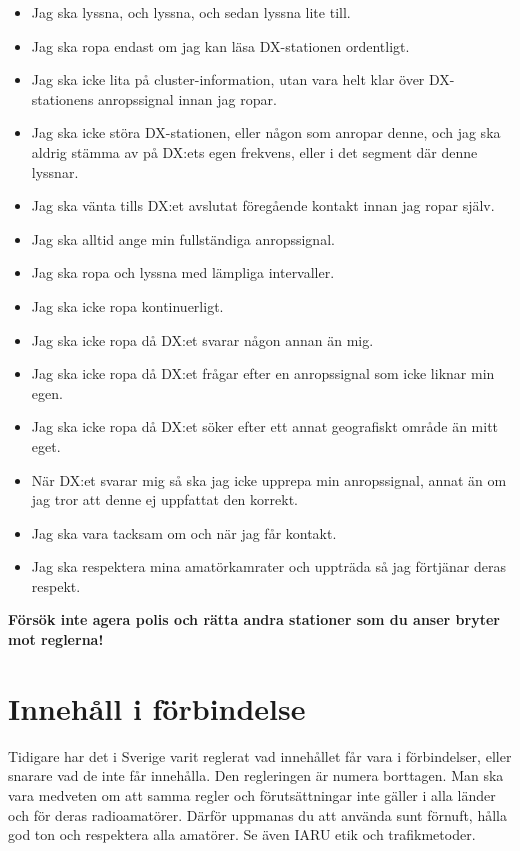 \begin{itemize}
\item Jag ska lyssna, och lyssna, och sedan lyssna lite till.
\item Jag ska ropa endast om jag kan läsa DX-stationen ordentligt.
\item Jag ska icke lita på cluster-information, utan vara helt klar över DX-stationens anropssignal innan jag ropar.
\item Jag ska icke störa DX-stationen, eller någon som anropar denne, och jag ska aldrig stämma av på DX:ets egen frekvens, eller i det segment där denne lyssnar.
\item Jag ska vänta tills DX:et avslutat föregående kontakt innan jag ropar själv.
\item Jag ska alltid ange min fullständiga anropssignal.
\item Jag ska ropa och lyssna med lämpliga intervaller.
\item Jag ska icke ropa kontinuerligt.
\item Jag ska icke ropa då DX:et svarar någon annan än mig.
\item Jag ska icke ropa då DX:et frågar efter en anropssignal som icke liknar min egen.
\item Jag ska icke ropa då DX:et söker efter ett annat geografiskt område än mitt eget.
\item När DX:et svarar mig så ska jag icke upprepa min anropssignal, annat än om jag tror att denne ej uppfattat den korrekt.
\item Jag ska vara tacksam om och när jag får kontakt.
\item Jag ska respektera mina amatörkamrater och uppträda så jag förtjänar deras respekt.
\end{itemize}

\textbf{Försök inte agera polis och rätta andra stationer som du anser bryter mot reglerna!}

\section{Innehåll i förbindelse}

Tidigare har det i Sverige varit reglerat vad innehållet får vara i
förbindelser, eller snarare vad de inte får innehålla.
Den regleringen är numera borttagen.
Man ska vara medveten om att samma regler och förutsättningar inte gäller i
alla länder och för deras radioamatörer.
Därför uppmanas du att använda sunt förnuft, hålla god ton och respektera alla
amatörer.
Se även IARU etik och trafikmetoder.

